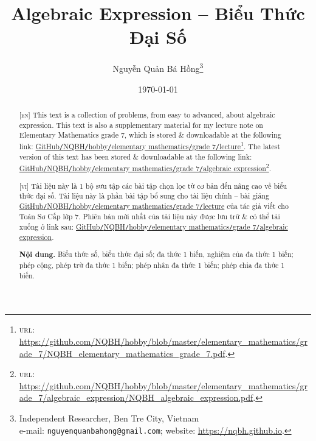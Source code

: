 \documentclass{article}
\title{Algebraic Expression -- Biểu Thức Đại Số}
\author{Nguyễn Quản Bá Hồng\footnote{Independent Researcher, Ben Tre City, Vietnam\\e-mail: \texttt{nguyenquanbahong@gmail.com}; website: \url{https://nqbh.github.io}.}}
\date{\today}
\numberwithin{equation}{section}
\begin{document}
\maketitle
\begin{abstract}
	\textsc{[en]} This text is a collection of problems, from easy to advanced, about algebraic expression. This text is also a supplementary material for my lecture note on Elementary Mathematics grade 7, which is stored \& downloadable at the following link: \href{https://github.com/NQBH/hobby/blob/master/elementary_mathematics/grade_7/NQBH_elementary_mathematics_grade_7.pdf}{GitHub\texttt{/}NQBH\texttt{/}hobby\texttt{/}elementary mathematics\texttt{/}grade 7\texttt{/}lecture}\footnote{\textsc{url}: \url{https://github.com/NQBH/hobby/blob/master/elementary_mathematics/grade_7/NQBH_elementary_mathematics_grade_7.pdf}.}. The latest version of this text has been stored \& downloadable at the following link: \href{https://github.com/NQBH/hobby/blob/master/elementary_mathematics/grade_7/algebraic_expression/NQBH_algebraic_expression.pdf}{GitHub\texttt{/}NQBH\texttt{/}hobby\texttt{/}elementary mathematics\texttt{/}grade 7\texttt{/}algebraic expression}\footnote{\textsc{url}: \url{https://github.com/NQBH/hobby/blob/master/elementary_mathematics/grade_7/algebraic_expression/NQBH_algebraic_expression.pdf}.}.
	\vspace{2mm}
	
	\textsc{[vi]} Tài liệu này là 1 bộ sưu tập các bài tập chọn lọc từ cơ bản đến nâng cao về biểu thức đại số. Tài liệu này là phần bài tập bổ sung cho tài liệu chính -- bài giảng \href{https://github.com/NQBH/hobby/blob/master/elementary_mathematics/grade_7/NQBH_elementary_mathematics_grade_7.pdf}{GitHub\texttt{/}NQBH\texttt{/}hobby\texttt{/}elementary mathematics\texttt{/}grade 7\texttt{/}lecture} của tác giả viết cho Toán Sơ Cấp lớp 7. Phiên bản mới nhất của tài liệu này được lưu trữ \& có thể tải xuống ở link sau: \href{https://github.com/NQBH/hobby/blob/master/elementary_mathematics/grade_7/algebraic_expression/NQBH_algebraic_expression.pdf}{GitHub\texttt{/}NQBH\texttt{/}hobby\texttt{/}elementary mathematics\texttt{/}grade 7\texttt{/}algebraic expression}.
	
	\textsf{\textbf{Nội dung.} Biểu thức số, biểu thức đại số; đa thức 1 biến, nghiệm của đa thức 1 biến; phép cộng, phép trừ đa thức 1 biến; phép nhân đa thức 1 biến; phép chia đa thức 1 biến.}
\end{abstract}
\setcounter{secnumdepth}{4}
\setcounter{tocdepth}{3}
\tableofcontents
\newpage
\end{document}
